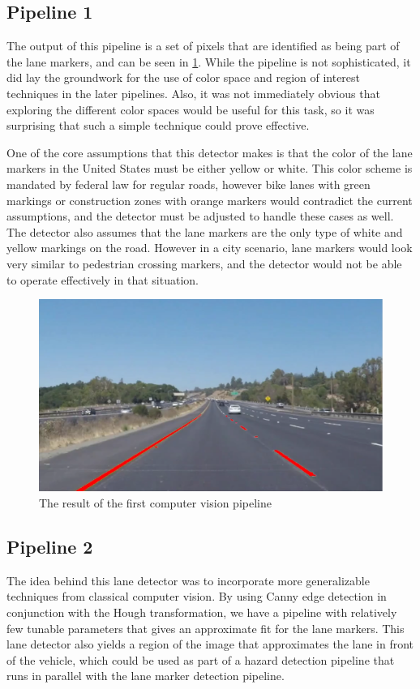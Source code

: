 \documentclass[conf]{new-aiaa}
\begin{document}
\subsection{Pipeline 1}
The output of this pipeline is a set of pixels that are identified as being part of the lane markers, and can be seen in \ref{fig:basic_shaded}. While the pipeline is not sophisticated, it did lay the groundwork for the use of color space and region of interest techniques in the later pipelines.  Also, it was not immediately obvious that exploring the different color spaces would be useful for this task, so it was surprising that such a simple technique could prove effective.

One of the core assumptions that this detector makes is that the color of the lane markers in the United States must be either yellow or white.  This color scheme is mandated by federal law for regular roads, however bike lanes with green markings or construction zones with orange markers would contradict the current assumptions, and the detector must be adjusted to handle these cases as well.  The detector also assumes that the lane markers are the only type of white and yellow markings on the road.  However in a city scenario, lane markers would look very similar to pedestrian crossing markers, and the detector would not be able to operate effectively in that situation.

\begin{figure}[h!]
    \centering
    \includegraphics[scale = 0.5]{"./images/basic_final"}
    \caption{The result of the first computer vision pipeline}
    \label{fig:basic_shaded}
\end{figure}

\subsection{Pipeline 2}
The idea behind this lane detector was to incorporate more generalizable techniques from classical computer vision.  By using Canny edge detection in conjunction with the Hough transformation, we have a pipeline with relatively few tunable parameters that gives an approximate fit for the lane markers.  This lane detector also yields a region of the image that approximates the lane in front of the vehicle, which could be used as part of a hazard detection pipeline that runs in parallel with the lane marker detection pipeline.
\end{document}
